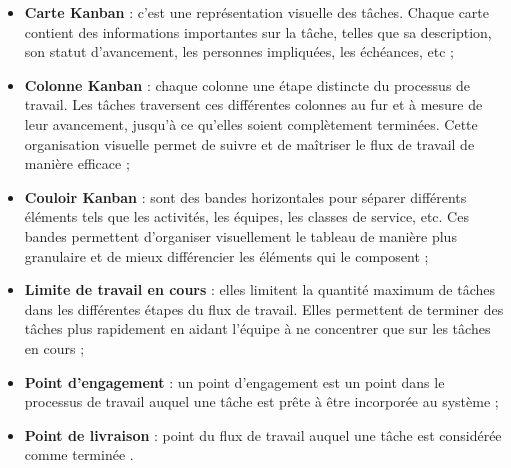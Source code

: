 \begin{itemize}
    \item{\textbf{Carte Kanban}} : c'est une représentation visuelle des tâches. Chaque carte contient des informations importantes sur la tâche, telles que sa description, son statut d'avancement, les personnes impliquées, 
    les échéances, etc\cite{tableau} ;
    \item {\textbf{Colonne Kanban}} : chaque colonne une étape distincte du processus de travail. Les tâches traversent ces différentes colonnes au fur et à mesure 
    de leur avancement, jusqu'à ce qu'elles soient complètement terminées. Cette organisation visuelle permet de suivre et de maîtriser le flux de travail de manière efficace \cite{tableau} ;

    \item{\textbf{Couloir Kanban}} : sont des bandes horizontales pour séparer différents éléments tels que les activités, les équipes, les classes de service, etc.
     Ces bandes permettent d'organiser visuellement le tableau de manière plus granulaire et de mieux différencier les éléments qui le composent \cite{tableau} ;

     \item{\textbf{Limite de travail en cours}} : elles limitent la quantité maximum de tâches dans les différentes étapes du flux de travail.
      Elles permettent de terminer des tâches plus rapidement en aidant l'équipe à ne concentrer que sur les tâches en cours \cite{tableau};

    \item{\textbf{Point d'engagement}} : un point d'engagement est un point dans le processus de travail auquel une tâche est prête à être incorporée au système \cite{tableau} ;
    \item{\textbf{Point de livraison }} : point du flux de travail auquel une tâche est considérée comme terminée \cite{tableau}.
\end{itemize}
